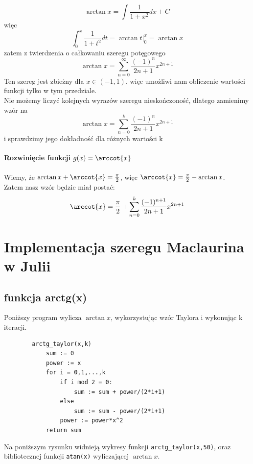 \documentclass[11pt,a4paper]{article}
\begin{document}
    $$\arctan{x} = \int\frac{1}{1+x^2}dx + C$$
    więc $$ \int_0^x\frac{1}{1+t^2}dt = \arctan{t} |_0^x = \arctan{x}$$ %
    zatem z twierdzenia o całkowaniu szeregu potęgowego
    $$\arctan{x} = \sum_{n=0}^{\infty}\frac{(-1)^{n}}{2n+1}x^{2n+1}$$
    Ten szereg jest zbieżny dla $x\in(-1,1)$, więc umożliwi nam obliczenie wartości funkcji tylko w tym przedziale.\\
    Nie możemy liczyć kolejnych wyrazów szeregu nieskończoność, dlatego zamienimy wzór na 
    $$\arctan{x} = \sum_{n=0}^{k}\frac{(-1)^{n}}{2n+1}x^{2n+1}$$
    i sprawdzimy jego dokładność dla różnych wartości k
    \\\\
    \textbf{Rozwinięcie funkcji $g(x)=\arccot{x}$}\\\\
    Wiemy, że $\arctan{x}+\arccot{x} = \frac{\pi}{2}$, więc $\arccot{x} = \frac{\pi}{2}-\arctan{x}$.\\
    Zatem nasz wzór będzie miał postać:
    $$\arccot{x} = \frac{\pi}{2}+\sum_{n=0}^{k}\frac{(-1)^{n+1}}{2n+1}x^{2n+1}$$
    \section{Implementacja szeregu Maclaurina w Julii}
    \subsection{funkcja arctg(x)}
    Poniższy program wylicza $\arctan{x}$, wykorzystując wzór Taylora i wykonując k iteracji.
    \begin{verbatim}
        arctg_taylor(x,k)
            sum := 0
            power := x
            for i = 0,1,...,k
                if i mod 2 = 0:
                    sum := sum + power/(2*i+1)
                else
                    sum := sum - power/(2*i+1)
                power := power*x^2
            return sum
    \end{verbatim}

    Na poniższym rysunku widnieją wykresy funkcji \verb!arctg_taylor(x,50)!, oraz bibliotecznej funkcji \verb!atan(x)! wyliczającej $\arctan{x}$.\\
\end{document}
